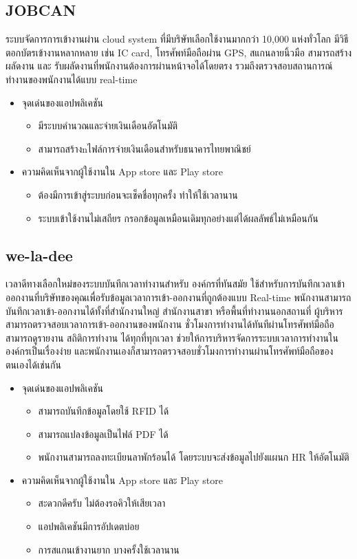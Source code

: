 \subsection{JOBCAN}
\quad ระบบจัดการการเข้างานผ่าน cloud system ที่มีบริษัทเลือกใช้งานมากกว่า 10,000 แห่งทั่วโลก 
มีวิธีตอกบัตรเข้างานหลากหลาย เช่น IC card, โทรศัพท์มือถือผ่าน GPS, สแกนลายนิ้วมือ สามารถสร้างผลัดงาน และ 
รับผลัดงานที่พนักงานต้องการผ่านหน้าจอได้โดยตรง รวมถึงตรวจสอบสถานการณ์ทำงานของพนักงานได้แบบ real-time
\cite{jobcan}
\begin{itemize}
  \item จุดเด่นของแอปพลิเคชัน
  \begin{itemize}
    \item มีระบบคำนวณและจ่ายเงินเดือนอัตโนมัติ
    \item สามารถสร้างnไฟล์การจ่ายเงินเดือนสำหรับธนาคารไทยพาณิชย์
  \end{itemize}
  \item ความคิดเห็นจากผู้ใช้งานใน App store และ Play store
  \begin{itemize}
    \item ต้องมีการเข้าสู่ระบบก่อนจะเช็คชื่อทุกครั้ง ทำให้ใช้เวลานาน
    \item ระบบเข้าใช้งานไม่เสถียร กรอกข้อมูลเหมือนเดิมทุกอย่างแต่ได้ผลลัพธ์ไม่เหมือนกัน
  \end{itemize}
\end{itemize}

\subsection{we-la-dee}
\quad เวลาดีทางเลือกใหม่ของระบบบันทึกเวลาทำงานสำหรับ องค์กรที่ทันสมัย 
ใช้สำหรับการบันทึกเวลาเข้าออกงานที่บริษัทของคุณเพื่อรับข้อมูลเวลาการเข้า-ออกงานที่ถูกต้องแบบ Real-time 
พนักงานสามารถบันทึกเวลาเข้า-ออกงานได้ทั้งที่สำนักงานใหญ่ สำนักงานสาขา หรือพื้นที่ทำงานนอกสถานที่ 
ผู้บริหารสามารถตรวจสอบเวลาการเข้า-ออกงานของพนักงาน ชั่วโมงการทำงานได้ทันทีผ่านโทรศัพท์มือถือ 
สามารถดูรายงาน สถิติการทำงาน ได้ทุกที่ทุกเวลา ช่วยให้การบริหารจัดการระบบเวลาการทำงานในองค์กรเป็นเรื่องง่าย 
และพนักงานเองก็สามารถตรวจสอบชั่วโมงการทำงานผ่านโทรศัพท์มือถือของตนเองได้เช่นกัน 
\cite{weladee}
\begin{itemize}
  \item จุดเด่นของแอปพลิเคชัน
  \begin{itemize}
    \item สามารถบันทึกข้อมูลโดยใช้ RFID ได้ 
    \item สามารถแปลงข้อมูลเป็นไฟล์ PDF ได้ 
    \item พนักงานสามารถลงทะเบียนลาพักร้อนได้ โดยระบบจะส่งข้อมูลไปยังแผนก HR ให้อัตโนมัติ
  \end{itemize}
  \item ความคิดเห็นจากผู้ใช้งานใน App store และ Play store
  \begin{itemize}
    \item สะดวกดีครับ ไม่ต้องรอคิวให้เสียเวลา 
    \item แอปพลิเคชันมีการอัปเดตบ่อย 
    \item การสแกนเข้างานยาก บางครั้งใช้เวลานาน  
  \end{itemize}
\end{itemize}

